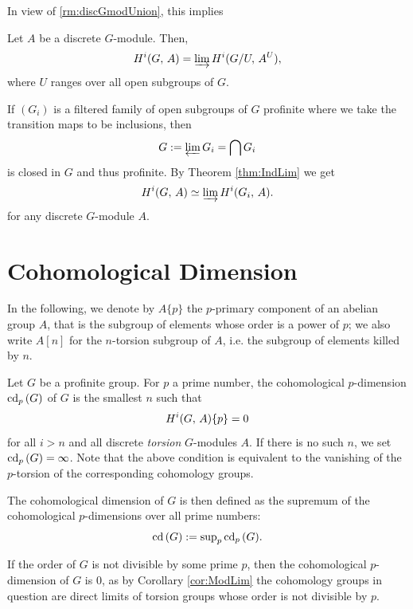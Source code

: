 \documentclass[a4paper, oneside]{memoir}
\begin{document}
In view of \ref{rm:discGmodUnion}, this implies
\begin{corollary}\label{cor:ModLim}
	Let $A$ be a discrete $G$-module. Then,
	\[
		H^{i}( G, \, A )=\varinjlim{H^{i}( G/U, \, A^U )},
	\]
	where $U$ ranges over all open subgroups of $G$.
\end{corollary}


\begin{example}\label{ex:IntOpenSgr}
	If $(G_i)$ is a filtered family of open subgroups of $G$ profinite where we take the transition maps to be inclusions, then
	\[
		G:=\varprojlim{G_i}=\bigcap{G_i}
	\]
	is closed in $G$ and thus profinite.
	By Theorem \ref{thm:IndLim} we get
	\[
		H^{i}( G, \, A )\simeq \varinjlim{H^{i}( G_i, \, A )}.
	\]
	for any discrete $G$-module $A$.
\end{example}



\section{Cohomological Dimension}

In the following, we denote by $A\{p\}$ the $p$-primary component of an abelian group $A$, that is the subgroup of elements whose order is a power of $p$; we also write $A[n]$ for the $n$-torsion subgroup of $A$, i.e. the subgroup of elements killed by $n$.

\begin{definition}
	Let $G$ be a profinite group. For $p$ a prime number, the cohomological $p$-dimension $\operatorname{cd}_p{(G)}$ of $G$ is the smallest $n$ such that
	\[
		H^{i}( G, \, A )\{p\}=0
	\] for all $i>n$ and all discrete \textit{torsion} $G$-modules $A$. If there is no such $n$, we set $\operatorname{cd}_p{(G)}=\infty$. Note that the above condition is equivalent to the vanishing of the $p$-torsion of the corresponding cohomology groups.

	The cohomological dimension of $G$ is then defined as the supremum of the cohomological $p$-dimensions over all prime numbers:
	\[
		\operatorname{cd}{(G)}:=\sup_{p}\nolimits\operatorname{cd}_p{(G)}.
	\]
\end{definition}

\begin{remark}
	If the order of $G$ is not divisible by some prime $p$, then the cohomological $p$-dimension of $G$ is $0$, as by Corollary \ref{cor:ModLim} the cohomology groups in question are direct limits of torsion groups whose order is not divisible by $p$.
\end{remark}
\end{document}
